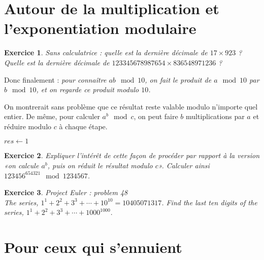 \documentclass[a4paper,10pt]{article}
\newtheorem{exo}{\sc Exercice}
{\theorembodyfont{\rmfamily}\newtheorem{exo-f}{\sc Exercice}}
\renewcommand{\[}{[\![}
\renewcommand{\]}{]\!]}
\renewcommand{\leq}{\leqslant}
\renewcommand{\=}{\mathop{=}\limits}
\newcommand{\aff}{\leftarrow}
\begin{document}
\section{Autour de la multiplication et l'exponentiation modulaire}
\begin{exo}
  Sans calculatrice : quelle est la dernière décimale de $17\times923$
  ?\\
  Quelle est la dernière décimale de 
$123345678987654\times 836548971236$ ?
\end{exo}
Donc finalement : \emph{pour connaître $ab\mod10$, on
  fait le produit de $a\mod 10$ par $b\mod 10$, et on regarde ce
  produit modulo $10$.}

On montrerait sans problème que ce résultat reste valable modulo
n'importe quel entier. De même, pour calculer $a^b\mod c$, on peut
faire $b$ multiplications par $a$ et réduire modulo $c$ à chaque
étape.

\begin{algorithm}[H] 
$res\aff1$\\
\Pour{$i$ de $1$ à $b$}{
  $res\aff res\times a \mod c$
   }
\end{algorithm}
\begin{exo}\label{puis}
  Expliquer l'intérêt de cette façon de procéder par rapport à la
  version «on calcule $a^b$, puis on réduit le résultat modulo $c$».
  Calculer ainsi $123456^{654321}\mod1234567$.
\end{exo}


\begin{exo}\label{p48} \emph{Project Euler : problem 48}\\
  The series, $1^1 + 2^2 + 3^3 + \cdots + 10^{10} = 10405071317$.
Find the last ten digits of the series, 
$1^1 + 2^2 + 3^3 + \cdots + 1000^{1000}.$

\end{exo}



\section{Pour ceux qui s'ennuient}
%
\end{document}
